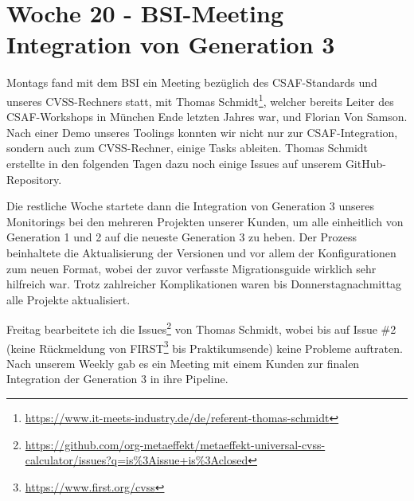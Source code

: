 \section{Woche 20 - BSI-Meeting \headerand Integration von Generation 3} \label{sec:bericht-wo-20}


\lweekdaymarginpar{\weekdayMondayLong}

Montags fand mit dem BSI ein Meeting bezüglich des CSAF-Standards und unseres CVSS-Rechners statt, mit Thomas Schmidt\footnote{\url{https://www.it-meets-industry.de/de/referent-thomas-schmidt}}, welcher bereits Leiter des CSAF-Workshops in München Ende letzten Jahres war, und Florian Von Samson.
Nach einer Demo unseres Toolings konnten wir nicht nur zur CSAF-Integration, sondern auch zum CVSS-Rechner, einige Tasks ableiten.
Thomas Schmidt erstellte in den folgenden Tagen dazu noch einige Issues auf unserem GitHub-Repository.

\sweekdaymarginpar{\weekdayTuesdayShort\ - \weekdayThursdayShort}

Die restliche Woche startete dann die Integration von Generation 3 unseres Monitorings bei den mehreren Projekten unserer Kunden, um alle einheitlich von Generation 1 und 2 auf die neueste Generation 3 zu heben.
Der Prozess beinhaltete die Aktualisierung der Versionen und vor allem der Konfigurationen zum neuen Format, wobei der zuvor verfasste Migrationsguide wirklich sehr hilfreich war.
Trotz zahlreicher Komplikationen waren bis Donnerstagnachmittag alle Projekte aktualisiert.

\sweekdaymarginpar{\weekdayFridayLong}

Freitag bearbeitete ich die Issues\footnote{\url{https://github.com/org-metaeffekt/metaeffekt-universal-cvss-calculator/issues?q=is\%3Aissue+is\%3Aclosed}} von Thomas Schmidt, wobei bis auf Issue \#2 (keine Rückmeldung von FIRST\footnote{\url{https://www.first.org/cvss}} bis Praktikumsende) keine Probleme auftraten.
Nach unserem Weekly gab es ein Meeting mit einem Kunden zur finalen Integration der Generation 3 in ihre Pipeline.
